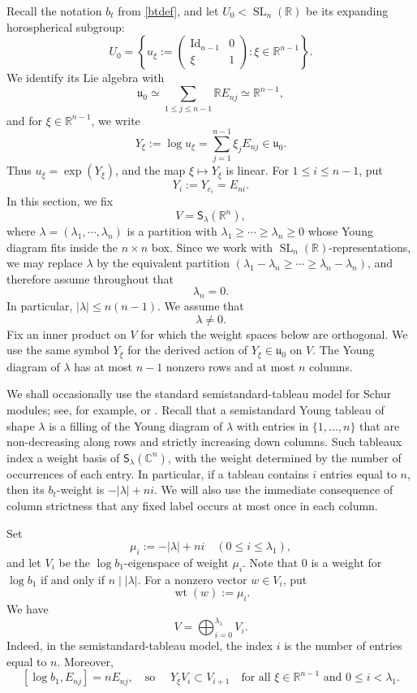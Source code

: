 \documentclass[reqno,11pt]{amsart}
\numberwithin{equation}{section}
\theoremstyle{definition}
\theoremstyle{remark}
\newcommand{\op}{\operatorname}
\newcommand{\R}{\mathbb R}
\newcommand{\br}{\mathbb R}
\newcommand{\SL}{\op{SL}}
\begin{document}
Recall the notation $b_t$ from \eqref{btdef}, and let $U_0<\SL_n(\br)$ be
its expanding horospherical subgroup:
$$
U_0 =
\left\{
u_\xi:=
\begin{pmatrix}
\operatorname{Id}_{n-1} & 0\\
\xi & 1
\end{pmatrix}
:\xi\in\R^{n-1}
\right\}.
$$
We identify its Lie algebra with
$$
\mathfrak u_0
\simeq
\sum_{1\le j\le n-1}\R E_{nj}
\simeq
\R^{n-1},
$$
and for $\xi\in\R^{n-1}$, we write
$$
Y_\xi:=\log u_\xi=\sum_{j=1}^{n-1}\xi_jE_{nj}\in\mathfrak u_0.
$$
Thus $u_\xi=\exp(Y_\xi)$, and the map $\xi\mapsto Y_\xi$ is linear.
For $1\le i\le n-1$, put
$$
Y_i:=Y_{e_i}=E_{ni}.
$$
In this section, we fix
$$
V={\mathsf S}_\lambda(\R^n),
$$
where $\lambda=(\lambda_1, \cdots,  \lambda_n)$ is a partition with
$\lambda_1\ge  \cdots\ge  \lambda_n\ge 0 $  whose Young diagram fits inside the
$n\times n$ box. Since we work with $\SL_n(\R)$-representations, we may
replace $\lambda$ by the equivalent partition $(\lambda_1-\lambda_n \ge \cdots \ge \lambda_n-\lambda_n)$, and  therefore assume throughout that
\begin{equation}\label{eq:lambda-reduced}
\lambda_n=0.
\end{equation} In particular, $|\lambda|\le n(n-1)$.
We assume that $$\lambda\ne0.$$  Fix an inner product
on $V$ for which the weight spaces below are orthogonal. We use the same
symbol $Y_\xi$ for the derived action of $Y_\xi\in\mathfrak u_0$ on $V$.
The Young diagram of $\lambda$ has at most $n-1$ nonzero
rows and at most $n$ columns.

We shall occasionally use the standard semistandard-tableau model for
Schur modules; see, for example, \cite[Chapter~I]{FultonYT} or
\cite[Section~4.2]{FultonHarris}. Recall that a semistandard Young
tableau of shape $\lambda$ is a filling of the Young diagram of $\lambda$
with entries in $\{1,\ldots,n\}$ that are non-decreasing along rows and
strictly increasing down columns. Such tableaux index a weight
basis of ${\mathsf S}_\lambda(\mathbb C^n)$, with the weight determined by
the number of occurrences of each entry. In particular, if a tableau
contains $i$ entries equal to $n$, then its $b_t$-weight is
$-|\lambda|+ni$. We will also use the immediate consequence of column
strictness that any fixed label occurs at most once in each column.

Set
$$
\mu_i:=-|\lambda|+ni 
\quad (0\le i\le \lambda_1),
$$
and let $V_i$ be the $\log b_1$-eigenspace of weight $\mu_i$. Note that $0$ is a weight for $\log b_1$ if and only if $n\mid |\lambda|$. For a nonzero
vector $w\in V_i$, put $$\operatorname{wt}(w):=\mu_i.$$ We have
$$
V=\bigoplus_{i=0}^{\lambda_1}V_i.
$$
Indeed, in the semistandard-tableau model, the index $i$ is the number of
entries equal to $n$. Moreover,
$$
[\log b_1,E_{nj}]=nE_{nj},
\quad\text{
so } \quad Y_\xi V_i\subset V_{i+1} \quad \text{for all $\xi\in\R^{n-1}$ and $0\le i<\lambda_1$}.$$
\end{document}
